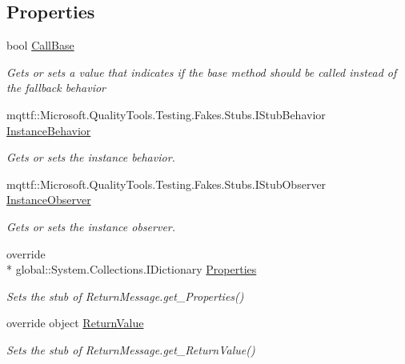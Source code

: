 \subsection*{Properties}
\begin{DoxyCompactItemize}
\item 
bool \hyperlink{class_system_1_1_runtime_1_1_remoting_1_1_messaging_1_1_fakes_1_1_stub_return_message_a83d57d87feef8022cc3708023e270930}{Call\-Base}
\begin{DoxyCompactList}\small\item\em Gets or sets a value that indicates if the base method should be called instead of the fallback behavior\end{DoxyCompactList}\item 
mqttf\-::\-Microsoft.\-Quality\-Tools.\-Testing.\-Fakes.\-Stubs.\-I\-Stub\-Behavior \hyperlink{class_system_1_1_runtime_1_1_remoting_1_1_messaging_1_1_fakes_1_1_stub_return_message_a868e560b2d7f52c5276a756aa043efc8}{Instance\-Behavior}
\begin{DoxyCompactList}\small\item\em Gets or sets the instance behavior.\end{DoxyCompactList}\item 
mqttf\-::\-Microsoft.\-Quality\-Tools.\-Testing.\-Fakes.\-Stubs.\-I\-Stub\-Observer \hyperlink{class_system_1_1_runtime_1_1_remoting_1_1_messaging_1_1_fakes_1_1_stub_return_message_aea4708b41201ed7ddc1f3c789c773f2c}{Instance\-Observer}
\begin{DoxyCompactList}\small\item\em Gets or sets the instance observer.\end{DoxyCompactList}\item 
override \\*
global\-::\-System.\-Collections.\-I\-Dictionary \hyperlink{class_system_1_1_runtime_1_1_remoting_1_1_messaging_1_1_fakes_1_1_stub_return_message_a26ffcd468af69b92c233f249f57542d5}{Properties}
\begin{DoxyCompactList}\small\item\em Sets the stub of Return\-Message.\-get\-\_\-\-Properties()\end{DoxyCompactList}\item 
override object \hyperlink{class_system_1_1_runtime_1_1_remoting_1_1_messaging_1_1_fakes_1_1_stub_return_message_a408966dfe5890d12762e98d69df138b6}{Return\-Value}
\begin{DoxyCompactList}\small\item\em Sets the stub of Return\-Message.\-get\-\_\-\-Return\-Value()\end{DoxyCompactList}\end{DoxyCompactItemize}


